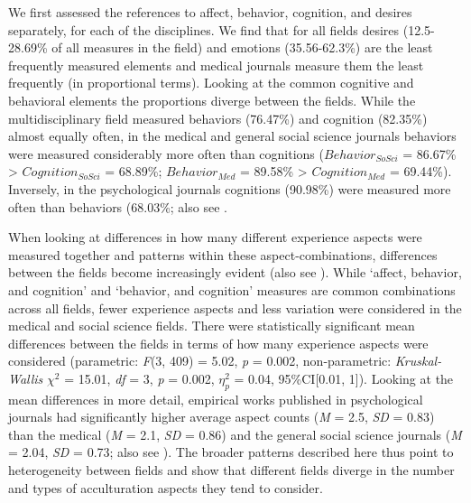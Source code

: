 We first assessed the references to affect, behavior, cognition, and
desires separately, for each of the disciplines. We find that for all
fields desires (12.5-28.69\% of all measures in the field) and emotions
(35.56-62.3\%) are the least frequently measured elements and medical
journals measure them the least frequently (in proportional terms).
Looking at the common cognitive and behavioral elements the proportions
diverge between the fields. While the multidisciplinary field measured
behaviors (76.47\%) and cognition (82.35\%) almost equally often, in the
medical and general social science journals behaviors were measured
considerably more often than cognitions (\(Behavior_{SoSci}\) = 86.67\%
\textgreater{} \(Cognition_{SoSci}\) = 68.89\%; \(Behavior_{Med}\) =
89.58\% \textgreater{} \(Cognition_{Med}\) = 69.44\%). Inversely, in the
psychological journals cognitions (90.98\%) were measured more often
than behaviors (68.03\%; also see .

When looking at differences in how many different experience aspects
were measured together and patterns within these aspect-combinations,
differences between the fields become increasingly evident (also see
). While `affect, behavior, and
cognition' and `behavior, and cognition' measures are common
combinations across all fields, fewer experience aspects and less
variation were considered in the medical and social science fields.
There were statistically significant mean differences between the fields
in terms of how many experience aspects were considered (parametric:
\textit{F}(3, 409) = 5.02, \textit{p} = 0.002, non-parametric:
\textit{Kruskal-Wallis} \(\chi^{2}\) = 15.01, \textit{df} = 3,
\textit{p} = 0.002, \(\eta_{p}^{2}\) = 0.04, 95\%CI{[}0.01, 1{]}).
Looking at the mean differences in more detail, empirical works
published in psychological journals had significantly higher average
aspect counts (\textit{M} = 2.5, \textit{SD} = 0.83) than the medical
(\textit{M} = 2.1, \textit{SD} = 0.86) and the general social science
journals (\textit{M} = 2.04, \textit{SD} = 0.73; also see
). The broader patterns described
here thus point to heterogeneity between fields and show that different
fields diverge in the number and types of acculturation aspects they
tend to consider.

